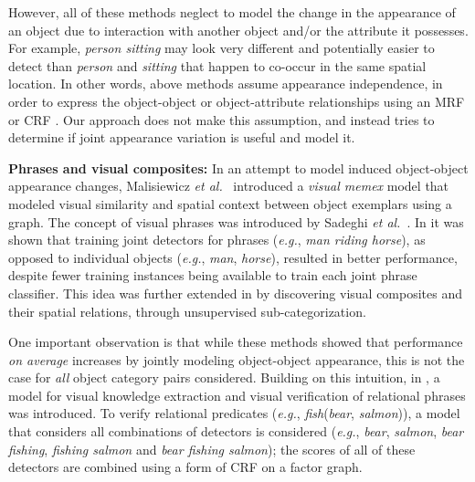 \documentclass[runningheads]{llncs}
\makeatletter
\newcommand*{\eg}{{\em e.g.}\@\xspace}
\newcommand*{\etal}{{\em et al.}\@\xspace}
\makeatother
\begin{document}
However, all of these methods neglect to model the change in the appearance of an object due to interaction with another object and/or the attribute it possesses. For example, {\em person sitting} may look very different and potentially easier to detect than {\em person} and {\em sitting} that happen to co-occur in the same spatial location. In other words, above methods assume appearance independence, in order to express the object-object or object-attribute relationships using an MRF or CRF \cite{Choi2010,Johnson2015,Yao2012}. Our approach does not make this assumption, and instead tries to determine if joint appearance variation is useful and model it.

\vspace{0.05in}
\noindent
{\bf Phrases and visual composites:} In an attempt to model induced object-object appearance changes, Malisiewicz \etal~\cite{Malisiewicz2009} introduced a {\em visual memex} model that modeled visual similarity and spatial context between object exemplars using a graph. The concept of visual phrases was introduced by Sadeghi \etal~\cite{Sadeghi2011}. In \cite{Sadeghi2011} it was shown that training joint detectors for phrases (\eg, {\em man riding horse}), as opposed to individual objects (\eg, {\em man}, {\em horse}), resulted in better performance, despite fewer training instances being available to train each joint phrase classifier. This idea was further extended in \cite{Lan2013} by discovering visual composites and their spatial relations, through unsupervised sub-categorization. %

One important observation is that while these methods showed that performance {\em on average} increases by jointly modeling object-object appearance, this is not the case for {\em all} object category pairs considered. 
Building on this intuition, in \cite{Sadeghi2015}, a model for visual knowledge extraction and visual verification of relational phrases was introduced. To verify relational predicates (\eg, {\em fish}({\em bear}, {\em salmon})), a model that considers all combinations of detectors is considered (\eg, {\em bear}, {\em salmon}, {\em bear fishing}, {\em fishing salmon} and {\em bear fishing salmon}); the scores of all of these detectors are combined using a form of CRF on a factor graph. 
\end{document}
